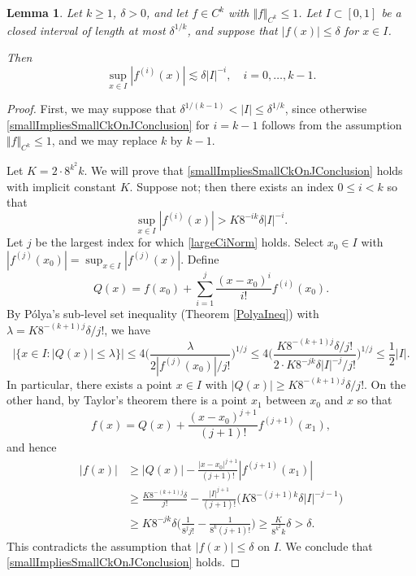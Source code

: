 \documentclass[letterpaper, reqno,11pt]{article}
\numberwithin{equation}{section}
\numberwithin{thm}{section}
\newtheorem{lem}[thm]{Lemma}
\theoremstyle{remark}
\begin{document}
\begin{lem}\label{smallImpliesSmallCkOnJ}
Let $k\geq 1$, $\delta>0$, and let $f\in C^k$ with $\Vert f \Vert_{C^k}\leq 1$. Let $I\subset[0,1]$ be a closed interval of length at most $\delta^{1/k}$, and suppose that $|f(x)|\leq\delta$ for $x\in I$. 

Then 
\begin{equation}\label{smallImpliesSmallCkOnJConclusion}
\sup_{x\in I}|f^{(i)}(x)|\lesssim\delta|I|^{-i},\quad i=0,\ldots,k-1.
\end{equation}
\end{lem}
%
%
%
\begin{proof}
First, we may suppose that $\delta^{1/(k-1)}<|I|\leq\delta^{1/k}$, since otherwise \eqref{smallImpliesSmallCkOnJConclusion} for $i=k-1$ follows from the assumption $\Vert f \Vert_{C^k}\leq 1$, and we may replace $k$ by $k-1$. 

Let $K=2\cdot 8^{k^2}k$. We will prove that \eqref{smallImpliesSmallCkOnJConclusion} holds with implicit constant $K$. Suppose not; then there exists an index $0\leq i< k$ so that
\begin{equation}\label{largeCiNorm}
\sup_{x\in I}|f^{(i)}(x)| > K 8^{-ik}\delta|I|^{-i}.
\end{equation}
Let $j$ be the largest index for which \eqref{largeCiNorm} holds. Select $x_0\in I$ with $|f^{(j)}(x_0)|=\sup_{x\in I}|f^{(j)}(x)|$. Define 
\[
Q(x) = f(x_0) + \sum_{i=1}^j \frac{(x-x_0)^i}{i!} f^{(i)}(x_0).
\]
 By P\'olya's sub-level set inequality (Theorem \ref{PolyaIneq}) with $\lambda = K8^{-(k+1)j}\delta/j!$, we have
\begin{equation}
|\{x\in I\colon |Q(x)| \leq \lambda \}| \leq 4\Big( \frac{ \lambda }{2 |f^{(j)}(x_0)|/j! } \Big)^{1/j}\leq 4\Big( \frac{K8^{-(k+1)j}\delta/j!}{ 2\cdot K8^{-jk}\delta|I|^{-j}/j!  } \Big)^{1/j}\leq \frac{1}{2}|I|.
\end{equation}
In particular, there exists a point $x\in I$ with $|Q(x)|\geq K8^{-(k+1)j} \delta/j!$. On the other hand, by Taylor's theorem there is a point $x_1$ between $x_0$ and $x$ so that 
\[
f(x) = Q(x) + \frac{(x-x_0)^{j+1}}{(j+1)!}f^{(j+1)}(x_1),
\]
and hence
\begin{equation}
\begin{split}
|f(x)| & \geq |Q(x)| - \frac{|x-x_0|^{j+1}}{(j+1)!}|f^{(j+1)}(x_1)|\\
&\geq \frac{K8^{-(k+1)j} \delta}{j!}  - \frac{|I|^{j+1}}{(j+1)!}\big( K8^{-(j+1)k} \delta|I|^{-j-1} \big)\\
& \geq K8^{-jk}\delta\Big( \frac{1}{8^jj!} - \frac{1}{8^k(j+1)!}\big) \geq \frac{K}{8^{k^2}k}\delta  >\delta.
\end{split}
\end{equation}
This contradicts the assumption that $|f(x)|\leq\delta$ on $I$.   We conclude that \eqref{smallImpliesSmallCkOnJConclusion} holds.
\end{proof}
\end{document}
